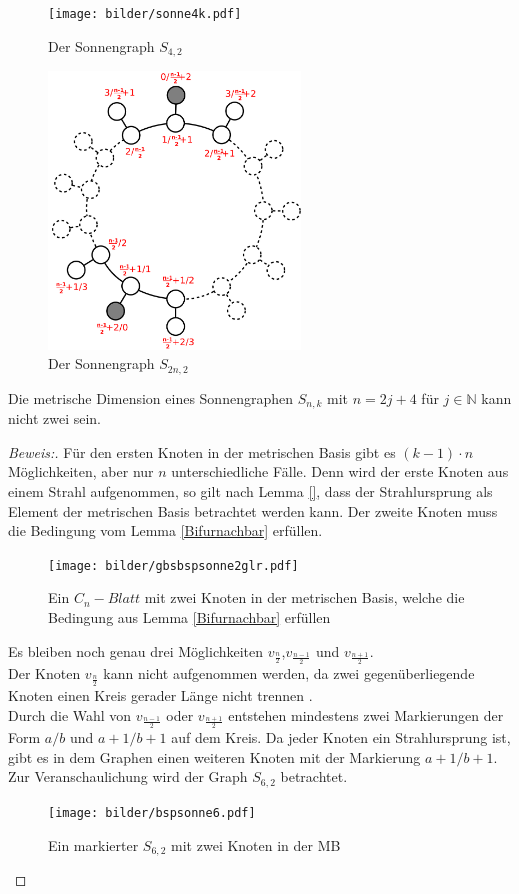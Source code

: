 \begin{figure}[h!]
\begin{minipage}[hbt]{7cm}
	\centering
	\texttt{[image: bilder/sonne4k.pdf]}  
   \caption{Der Sonnengraph $S_{4,2}$}  
	\label{Bild1}
\end{minipage}
\hfill
\begin{minipage}[hbt]{7cm}
	\centering
	\includegraphics[width=190pt]{bilder/sonne2.pdf}
   \caption{Der Sonnengraph $S_{2n,2}$}
	\label{Bild2}
\end{minipage}
\end{figure}
\begin{lem}
Die metrische Dimension eines Sonnengraphen $S_{n,k}$ mit $n = 2j+4$ für $j \in \mathbb{N}$ kann nicht zwei sein. 
\end{lem}
\begin{proof}[Beweis:]
Für den ersten Knoten in der metrischen Basis gibt es $(k-1)\cdot n$ Möglichkeiten, aber nur $n$ unterschiedliche Fälle. Denn wird der erste Knoten aus einem Strahl aufgenommen, so gilt nach Lemma \ref{}, dass der Strahlursprung als Element der metrischen Basis betrachtet werden kann. Der zweite Knoten muss die Bedingung vom Lemma \ref{Bifurnachbar} erfüllen.  
 \begin{figure}[h!]
		\centering
 		 \texttt{[image: bilder/gbsbspsonne2glr.pdf]}
   \caption{Ein $C_{n}-Blatt$ mit zwei Knoten in der metrischen Basis, welche die Bedingung aus Lemma \ref{Bifurnachbar} erfüllen}
  	 \end{figure}
  	  	 
Es bleiben noch genau drei Möglichkeiten $v_{\frac{n}{2}}$,$v_{\frac{n-1}{2}}$ und $v_{\frac{n+1}{2}}$.\\ 
Der Knoten $v_{\frac{n}{2}}$ kann nicht aufgenommen werden, da zwei gegenüberliegende Knoten einen Kreis gerader Länge nicht trennen \cite{}.\\
Durch die Wahl von $v_{\frac{n-1}{2}}$ oder $v_{\frac{n+1}{2}}$ entstehen mindestens zwei Markierungen der Form $a/b$ und $a+1/b+1$ auf dem Kreis. Da jeder Knoten ein Strahlursprung ist, gibt es in dem Graphen einen weiteren Knoten mit der Markierung $a+1/b+1$. Zur Veranschaulichung wird der Graph $S_{6,2}$ betrachtet.
\begin{figure}[h!]
		\centering
 		 \texttt{[image: bilder/bspsonne6.pdf]}
   \caption{Ein markierter $S_{6,2}$ mit zwei Knoten in der MB}
  	 \end{figure}
\end{proof}
